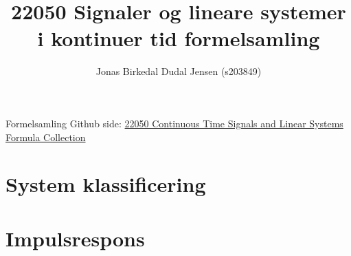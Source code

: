 \documentclass{article}
\title{22050 Signaler og lineare systemer i kontinuer tid formelsamling}
\date{}
\author{Jonas Birkedal Dudal Jensen (s203849)}
\begin{document}
	\maketitle
	\begin{center}
		Formelsamling Github side: \href{https://github.com/jondalnas/22050-Continuous-Time-Signals-and-Linear-Systems-Formula-Collection}{22050 Continuous Time Signals and Linear Systems Formula Collection}
	\end{center}

	\section{System klassificering}
	

	\section{Impulsrespons}
	
\end{document}

